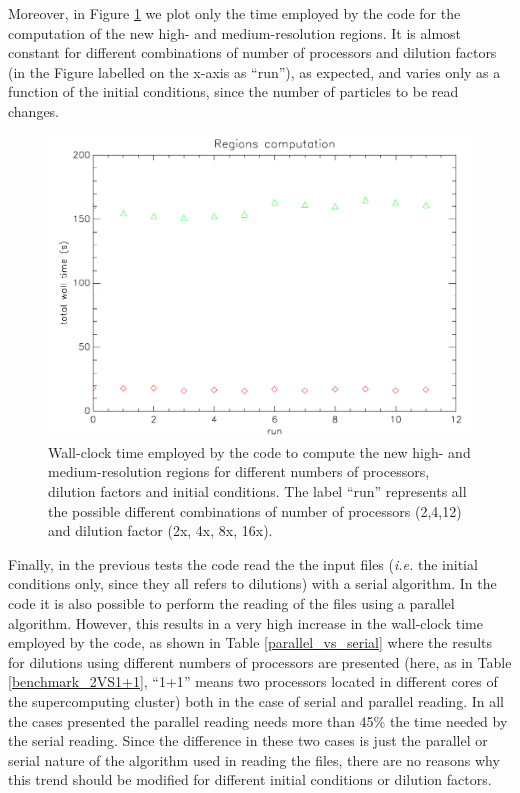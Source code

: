 \documentclass[11pt,a4paper,titlepage]{article}
\newcommand{\virg}[1]{``{#1}''}
\newcommand{\ie}{\emph{i.e.}\xspace}
\begin{document}
Moreover, in Figure \ref{benchmark_regions} we plot only the time employed by the code for the computation of the new high- and medium-resolution regions. It is almost constant for different combinations of number of processors and dilution factors (in the Figure labelled on the x-axis as \virg{run}), as expected, and varies only as a function of the initial conditions, since the number of particles to be read changes.

\begin{figure}[!tbp]
\centering
\includegraphics[width=\textwidth]{benchmark_regions.pdf}
\caption{Wall-clock time employed by the code to compute the new high- and medium-resolution regions for different numbers of processors, dilution factors and initial conditions. The label \virg{run} represents all the possible different combinations of number of processors (2,4,12) and dilution factor (2x, 4x, 8x, 16x).}
\label{benchmark_regions}
\end{figure}


Finally, in the previous tests the code read the the input files (\ie the initial conditions only, since they all refers to dilutions) with a serial algorithm. In the code it is also possible to perform the reading of the files using a parallel algorithm. However, this results in a very high increase in the wall-clock time employed by the code, as shown in Table \ref{parallel_vs_serial} where the results for dilutions using different numbers of processors are presented (here, as in Table \ref{benchmark_2VS1+1}, \virg{1+1} means two processors located in different cores of the supercomputing cluster) both in the case of serial and parallel reading. In all the cases presented the parallel reading needs more than 45\% the time needed by the serial reading. Since the difference in these two cases is just the parallel or serial nature of the algorithm used in reading the files, there are no reasons why this trend should be modified for different initial conditions or dilution factors.
\end{document}
